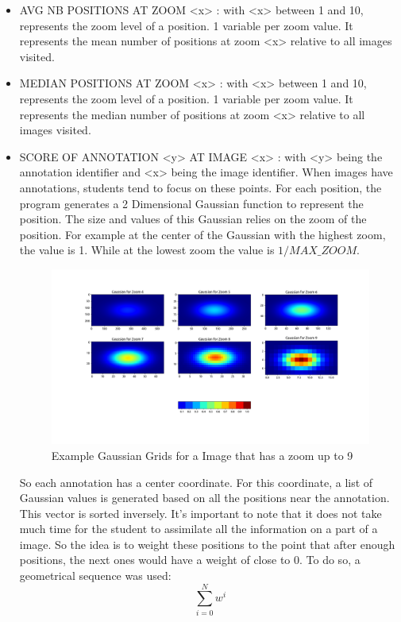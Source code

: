 \documentclass[a4paper,11pt]{report}
\numberwithin{figure}{section} %
\begin{document}
\begin{itemize}
    \item[\textbullet] AVG NB POSITIONS AT ZOOM <x> : with <x> between 1 and 10, represents the zoom level of a position.
    1 variable per zoom value.
    It represents the mean number of positions at zoom <x> relative to all images visited.\\
    \item[\textbullet] MEDIAN POSITIONS AT ZOOM <x> : with <x> between 1 and 10, represents the zoom level of a position.
    1 variable per zoom value.
    It represents the median number of positions at zoom <x> relative to all images visited.\\
    \item[\textbullet] SCORE OF ANNOTATION <y> AT IMAGE <x> : with <y> being the annotation identifier and <x> being the image identifier.
    When images have annotations, students tend to focus on these points.
    For each position, the program generates a 2 Dimensional Gaussian function to represent the position.
    The size and values of this Gaussian relies on the zoom of the position.
    For example at the center of the Gaussian with the highest zoom, the value is 1.
    While at the lowest zoom the value is $1/MAX\_ZOOM$.
    \begin{figure}[H]
\begin{center}
\includegraphics[scale=0.35]{gaussian.png}
\caption{Example Gaussian Grids for a Image that has a zoom up to 9}
\end{center}
\end{figure} 
   
   So each annotation has a center coordinate.
   For this coordinate, a list of Gaussian values is generated based on all the positions near the annotation.
   This vector is sorted inversely.
   It's important to note that it does not take much time for the student to assimilate all the information on a part of a image.
   So the idea is to weight these positions to the point that after enough positions, the next ones would have a weight of close to 0.
To do so, a geometrical sequence was used:  
	\[\sum\limits_{i=0}^N w^i\]


\end{itemize}
\end{document}
